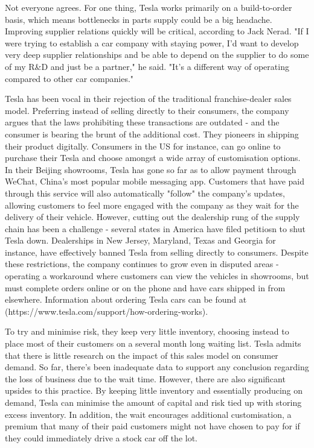 \documentclass[12pt]{article}
\begin{document}
Not everyone agrees. For one thing, Tesla works primarily on a build-to-order basis, which means bottlenecks in parts supply could be a big headache. Improving supplier relations quickly will be critical, according to Jack Nerad. "If I were trying to establish a car company with staying power, I'd want to develop very deep supplier relationships and be able to depend on the supplier to do some of my R\&D and just be a partner," he said. "It's a different way of operating compared to other car companies."

Tesla has been vocal in their rejection of the traditional franchise-dealer sales model. Preferring instead of selling directly to their consumers, the company argues that the laws prohibiting these transactions are outdated - and the consumer is bearing the brunt of the additional cost. They pioneers in shipping their product digitally. Consumers in the US for instance, can go online to purchase their Tesla and choose amongst a wide array of customisation options. In their Beijing showrooms, Tesla has gone so far as to allow payment through WeChat, China's most popular mobile messaging app. Customers that have paid through this service will also automatically "follow" the company's updates, allowing customers to feel more engaged with the company as they wait for the delivery of their vehicle. However, cutting out the dealership rung of the supply chain has been a challenge - several states in America have filed petitiosn to shut Tesla down. Dealerships in New Jersey, Maryland, Texas and Georgia for instance, have effectively banned Tesla from selling directly to consumers. Despite these restrictions, the company continues to grow even in disputed areas - operating a workaround where customers can view the vehicles in showrooms, but must complete orders online or on the phone and have cars shipped in from elsewhere. Information about ordering Tesla cars can be found at (https://www.tesla.com/support/how-ordering-works).

To try and minimise risk, they keep very little inventory, choosing instead to place most of their customers on a several month long waiting list. Tesla admits that there is little research on the impact of this sales model on consumer demand. So far, there's been inadequate data to support any conclusion regarding the loss of business due to the wait time. However, there are also significant upsides to this practice. By keeping little inventory and essentially producing on demand, Tesla can minimise the amount of capital and risk tied up with storing excess inventory. In addition, the wait encourages additional customisation, a premium that many of their paid customers might not have chosen to pay for if they could immediately drive a stock car off the lot.
\end{document}

